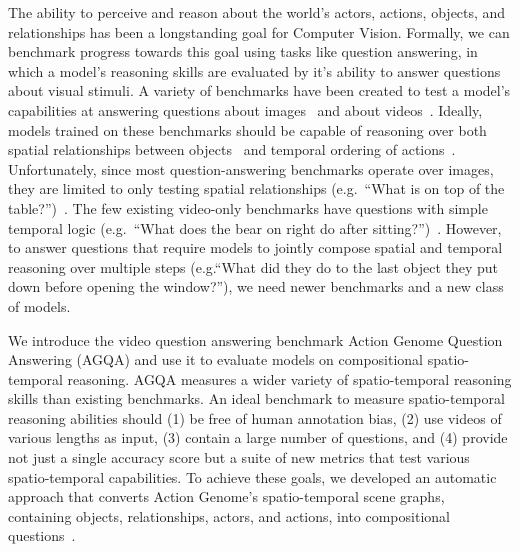 \documentclass[10pt,twocolumn,letterpaper]{article}
\newcommand{\rak}[1]{{\color{red}{rak: #1}}}
\newcommand{\mgm}[1]{{\color{cyan}{mgm: #1}}}
\begin{document}
The ability to perceive and reason about the world's actors, actions, objects, and relationships has been a longstanding goal for Computer Vision. Formally, we can benchmark progress towards this goal using tasks like question answering, in which a model's reasoning skills are evaluated by it's ability to answer questions about visual stimuli. A variety of benchmarks have been created to test a model's capabilities at answering questions about images~\cite{johnson2017clevr,hudson2019gqa,antol2015vqa,zellers2019recognition,goyal2017making,krishna2017visual,zhu2016visual7w,kim2020answering} and about videos~\cite{tapaswi2016movieqa,lei2018tvqa,jang2017tgif,kim2017deepstory,xu2017video,maharaj2017dataset,zeng2016leveraging,yu2019activitynet}. Ideally, models trained on these benchmarks should be capable of reasoning over both spatial relationships between objects~\cite{krishna2017visual,lu2016visual} and temporal ordering of actions~\cite{zacks2001events,ji2020action}. Unfortunately, since most question-answering benchmarks operate over images, they are limited to only testing spatial relationships (e.g.~``What is on top of the table?'')~\cite{hudson2019gqa,krishna2017visual,antol2015vqa}. The few existing video-only benchmarks have questions with simple temporal logic (e.g.~``What does the bear on right do after sitting?'')~\cite{jang2017tgif,xu2017video,maharaj2017dataset,zeng2016leveraging,yu2019activitynet}. However, to answer questions that require models to jointly compose spatial and temporal reasoning over multiple steps (e.g.``What did they do to the last object they put down before opening the window?''), we need newer benchmarks and a new class of models.


We introduce the video question answering benchmark Action Genome Question Answering (AGQA) and use it to evaluate models on compositional spatio-temporal reasoning. AGQA measures a wider variety of spatio-temporal reasoning skills than existing benchmarks. An ideal benchmark to measure spatio-temporal reasoning abilities should (1) be free of human annotation bias, (2) use videos of various lengths as input, (3) contain a large number of questions, and (4) provide not just a single accuracy score but a suite of new metrics that test various spatio-temporal capabilities. To achieve these goals, we developed an automatic approach that converts Action Genome’s spatio-temporal scene graphs, containing objects, relationships, actors, and actions, into compositional questions~\cite{ji2020action}.
\end{document}
